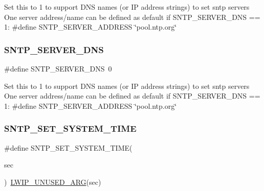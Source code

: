 Set this to 1 to support D\+NS names (or IP address strings) to set sntp servers One server address/name can be defined as default if S\+N\+T\+P\+\_\+\+S\+E\+R\+V\+E\+R\+\_\+\+D\+NS == 1\+: \#define S\+N\+T\+P\+\_\+\+S\+E\+R\+V\+E\+R\+\_\+\+A\+D\+D\+R\+E\+SS \char`\"{}pool.\+ntp.\+org\char`\"{} \mbox{\label{group__sntp__opts_gaef477c145ae404d77188b26b79b6996f}} 
\subsubsection{\texorpdfstring{S\+N\+T\+P\+\_\+\+S\+E\+R\+V\+E\+R\+\_\+\+D\+NS}{SNTP\_SERVER\_DNS}\hspace{0.1cm}{\footnotesize\ttfamily [2/2]}}
{\footnotesize\ttfamily \#define S\+N\+T\+P\+\_\+\+S\+E\+R\+V\+E\+R\+\_\+\+D\+NS~0}

Set this to 1 to support D\+NS names (or IP address strings) to set sntp servers One server address/name can be defined as default if S\+N\+T\+P\+\_\+\+S\+E\+R\+V\+E\+R\+\_\+\+D\+NS == 1\+: \#define S\+N\+T\+P\+\_\+\+S\+E\+R\+V\+E\+R\+\_\+\+A\+D\+D\+R\+E\+SS \char`\"{}pool.\+ntp.\+org\char`\"{} \mbox{\label{group__sntp__opts_gafe340b98c52dedcbc041267fe13b2da6}} 
\subsubsection{\texorpdfstring{S\+N\+T\+P\+\_\+\+S\+E\+T\+\_\+\+S\+Y\+S\+T\+E\+M\+\_\+\+T\+I\+ME}{SNTP\_SET\_SYSTEM\_TIME}\hspace{0.1cm}{\footnotesize\ttfamily [1/2]}}
{\footnotesize\ttfamily \#define S\+N\+T\+P\+\_\+\+S\+E\+T\+\_\+\+S\+Y\+S\+T\+E\+M\+\_\+\+T\+I\+ME(\begin{DoxyParamCaption}\item[{}]{sec }\end{DoxyParamCaption})~\hyperlink{group__compiler__abstraction_ga70624a5deb8b9199406372a7f3603ecf}{L\+W\+I\+P\+\_\+\+U\+N\+U\+S\+E\+D\+\_\+\+A\+RG}(sec)}

